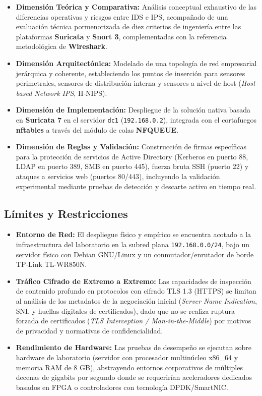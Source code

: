 \begin{itemize}
  \item \textbf{Dimensión Teórica y Comparativa:} Análisis conceptual exhaustivo de las diferencias operativas y riesgos entre IDS e IPS, acompañado de una evaluación técnica pormenorizada de diez criterios de ingeniería entre las plataformas \textbf{Suricata} y \textbf{Snort 3}, complementadas con la referencia metodológica de \textbf{Wireshark}.
  \item \textbf{Dimensión Arquitectónica:} Modelado de una topología de red empresarial jerárquica y coherente, estableciendo los puntos de inserción para sensores perimetrales, sensores de distribución interna y sensores a nivel de host (\textit{Host-based Network IPS}, H-NIPS).
  \item \textbf{Dimensión de Implementación:} Despliegue de la solución nativa basada en \textbf{Suricata 7} en el servidor \texttt{dc1} (\texttt{192.168.0.2}), integrada con el cortafuegos \textbf{nftables} a través del módulo de colas \textbf{NFQUEUE}.
  \item \textbf{Dimensión de Reglas y Validación:} Construcción de firmas específicas para la protección de servicios de Active Directory (Kerberos en puerto 88, LDAP en puerto 389, SMB en puerto 445), fuerza bruta SSH (puerto 22) y ataques a servicios web (puertos 80/443), incluyendo la validación experimental mediante pruebas de detección y descarte activo en tiempo real.
\end{itemize}

\subsection{Límites y Restricciones}

\begin{itemize}
  \item \textbf{Entorno de Red:} El despliegue físico y empírico se encuentra acotado a la infraestructura del laboratorio en la subred plana \texttt{192.168.0.0/24}, bajo un servidor físico con Debian GNU/Linux y un conmutador/enrutador de borde TP-Link TL-WR850N.
  \item \textbf{Tráfico Cifrado de Extremo a Extremo:} Las capacidades de inspección de contenido profundo en protocolos con cifrado TLS 1.3 (HTTPS) se limitan al análisis de los metadatos de la negociación inicial (\textit{Server Name Indication}, SNI, y huellas digitales de certificados), dado que no se realiza ruptura forzada de certificados (\textit{TLS Interception / Man-in-the-Middle}) por motivos de privacidad y normativas de confidencialidad.
  \item \textbf{Rendimiento de Hardware:} Las pruebas de desempeño se ejecutan sobre hardware de laboratorio (servidor con procesador multinúcleo x86\_64 y memoria RAM de 8 GB), abstrayendo entornos corporativos de múltiples decenas de gigabits por segundo donde se requerirían aceleradores dedicados basados en FPGA o controladores con tecnología DPDK/SmartNIC.
\end{itemize}
